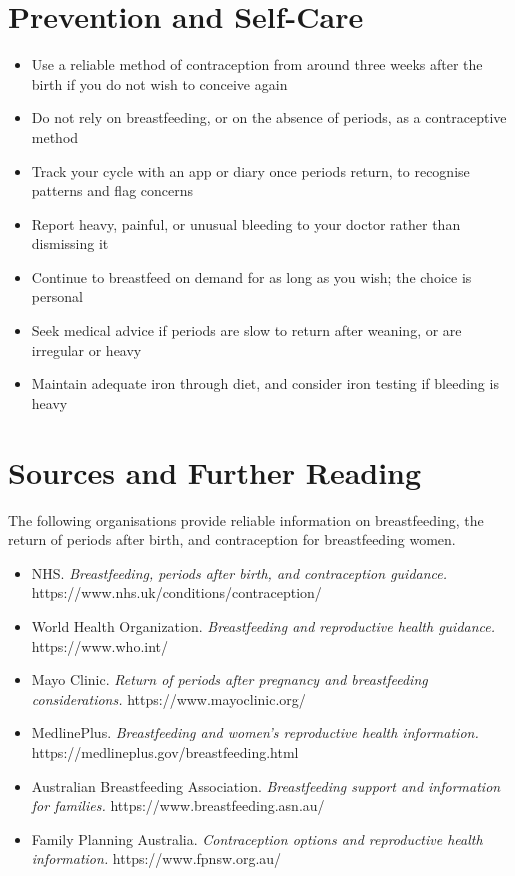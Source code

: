 \section*{Prevention and Self-Care}
\begin{itemize}
    \item Use a reliable method of contraception from around three weeks after the birth if you do not wish to conceive again
    \item Do not rely on breastfeeding, or on the absence of periods, as a contraceptive method
    \item Track your cycle with an app or diary once periods return, to recognise patterns and flag concerns
    \item Report heavy, painful, or unusual bleeding to your doctor rather than dismissing it
    \item Continue to breastfeed on demand for as long as you wish; the choice is personal
    \item Seek medical advice if periods are slow to return after weaning, or are irregular or heavy
    \item Maintain adequate iron through diet, and consider iron testing if bleeding is heavy
\end{itemize}

\section*{Sources and Further Reading}
The following organisations provide reliable information on breastfeeding, the return of periods after birth, and contraception for breastfeeding women.

\begin{itemize}
    \item NHS. \textit{Breastfeeding, periods after birth, and contraception guidance.} https://www.nhs.uk/conditions/contraception/
    \item World Health Organization. \textit{Breastfeeding and reproductive health guidance.} https://www.who.int/
    \item Mayo Clinic. \textit{Return of periods after pregnancy and breastfeeding considerations.} https://www.mayoclinic.org/
    \item MedlinePlus. \textit{Breastfeeding and women's reproductive health information.} https://medlineplus.gov/breastfeeding.html
    \item Australian Breastfeeding Association. \textit{Breastfeeding support and information for families.} https://www.breastfeeding.asn.au/
    \item Family Planning Australia. \textit{Contraception options and reproductive health information.} https://www.fpnsw.org.au/
\end{itemize}
